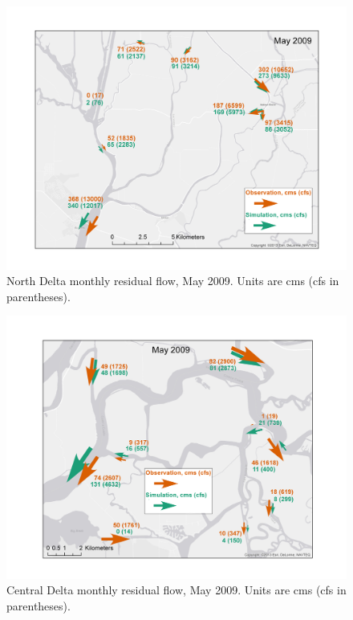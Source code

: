 	
\begin{figure}
	\centering
		\includegraphics[width=\textwidth]{image/residual_flow_north_delta_64a_may}
	\caption{North Delta monthly residual flow, May 2009. Units are cms (cfs in parentheses).}
	\label{fig:resid_north_may}
\end{figure}

	
\begin{figure}
	\centering
		\includegraphics[width=\textwidth]{image/residual_flow_central_delta_64a_may}
	\caption{Central Delta monthly residual flow, May 2009. Units are cms (cfs in parentheses).}
	\label{fig:resid_central_may}
\end{figure}

